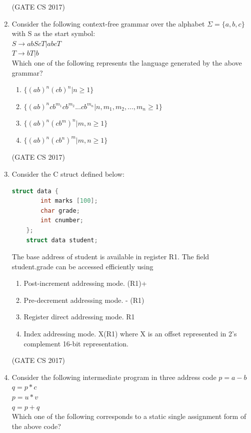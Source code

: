 \documentclass[a4paper, 11pt]{article}
\begin{document}
\begin{enumerate}
    \hfill (GATE CS 2017)
    
    \item Consider the following context-free grammar over the alphabet $\Sigma=\{a,b,c\}$ with S as the start symbol:\\ $S\rightarrow abScT|abcT$\\$T\rightarrow bT|b$\\
    Which one of the following represents the language generated by the above grammar?
    \begin{enumerate}
        \item $\{(ab)^{n}(cb)^{n}|n\ge1\}$
        \item $\{(ab)^{n}cb^{m_{1}}cb^{m_{2}}...cb^{m_{n}}|n,m_{1},m_{2},...,m_{n}\ge1\}$
        \item $\{(ab)^{n}(cb^{m})^{n}|m,n\ge1\}$
        \item $\{(ab)^{n}(cb^{n})^{m}|m,n\ge1\}$
    \end{enumerate}
    
    \hfill (GATE CS 2017)
    
    \item Consider the C struct defined below:
    
    \begin{lstlisting}[language=C]
    struct data {
        int marks [100];
        char grade;
        int cnumber;
    };
    struct data student;
    \end{lstlisting}
    
    The base address of student is available in register R1. The field student.grade can be accessed efficiently using
    
    \begin{enumerate}
        \item Post-increment addressing mode. (R1)+
        \item Pre-decrement addressing mode. - (R1)
        \item Register direct addressing mode. R1
        \item Index addressing mode. X(R1) where X is an offset represented in 2's complement 16-bit representation.
    \end{enumerate}
    
    \hfill (GATE CS 2017)
    
    \item Consider the following intermediate program in three address code
    $p=a-b$\\
    $q=p*c$\\
    $p=u*v$\\
    $q=p+q$\\
    Which one of the following corresponds to a static single assignment form of the above code?
    

\end{enumerate}
\end{document}
